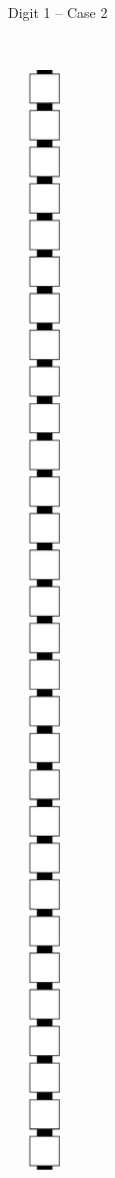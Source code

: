 \begin{enumerate}[label={--}]
\begin{figure}[H]
\begin{subfigure}[t]{0.2\textwidth}
                        \caption{\label{fig:warping/pre_warp_case2_digit1_msr} Digit 1 -- Case 2}
                    \end{subfigure}%
                    ~
                    \begin{subfigure}[t]{0.2\textwidth}
                        \centering
                        \includegraphics[width=0.2\textwidth]{warping/pre_warp_case2_digit2_msr}

\end{subfigure}
\end{figure}
\end{enumerate}
